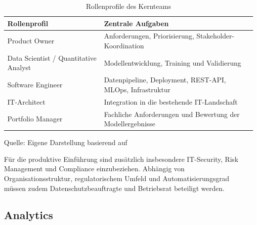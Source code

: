\begin{table}[!htb]
    \setlength{\arrayrulewidth}{1pt}
    \renewcommand{\arraystretch}{1.25}
    \begin{threeparttable}
        \caption{Rollenprofile des Kernteams}
        \label{tab:rollenprofile}

        \small

        \begin{tabularx}{\textwidth}{
            |>{\raggedright\arraybackslash}p{4.6cm}|
            >{\raggedright\arraybackslash}X|
        }
            \hline
            \textbf{Rollenprofil} &
            \textbf{Zentrale Aufgaben}
            \tabularnewline \hline

            Product Owner &
            Anforderungen, Priorisierung, Stakeholder-Koordination
            \tabularnewline \hline

            Data Scientist / Quantitative Analyst &
            Modellentwicklung, Training und Validierung
            \tabularnewline \hline

            Software Engineer &
            Datenpipeline, Deployment, REST-API, MLOps, Infrastruktur
            \tabularnewline \hline

            IT-Architect &
            Integration in die bestehende IT-Landschaft
            \tabularnewline \hline

            Portfolio Manager &
            Fachliche Anforderungen und Bewertung der Modellergebnisse
            \tabularnewline \hline
        \end{tabularx}

        \begin{tablenotes}[flushleft]
            \item \normalsize{Quelle: Eigene Darstellung basierend auf \cite{noauthor_mlops02-bp01_nodate}}
        \end{tablenotes}
    \end{threeparttable}
\end{table}

Für die produktive Einführung sind zusätzlich insbesondere IT-Security, Risk Management und Compliance einzubeziehen. Abhängig von Organisationsstruktur, regulatorischem Umfeld und Automatisierungsgrad müssen zudem Datenschutzbeauftragte und Betriebsrat beteiligt werden.


\subsection{Analytics}

